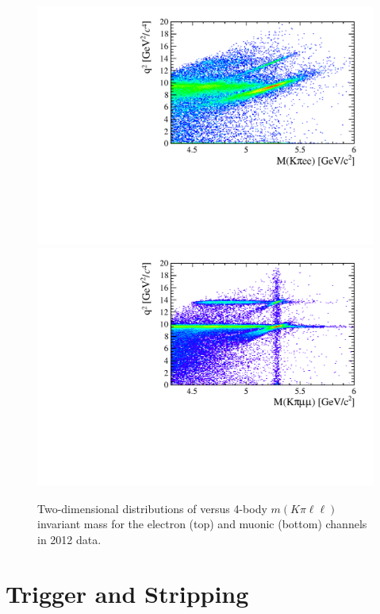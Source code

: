 \begin{figure}[t!]
\label{fig:2D_q2_B0mass}
\centering 
\includegraphics[width=1.\textwidth]{RKst/figs/electron_B0jpsi2D_selected.pdf}
\includegraphics[width=1.\textwidth]{RKst/figs/muon_B0jpsi2D_selected.pdf}
\caption{Two-dimensional distributions of \qsq versus 4-body $m(K\pi\ell\ell)$
invariant mass for the electron (top) and muonic (bottom) channels in 2012 data.}
\end{figure}


\section{Trigger and Stripping }

